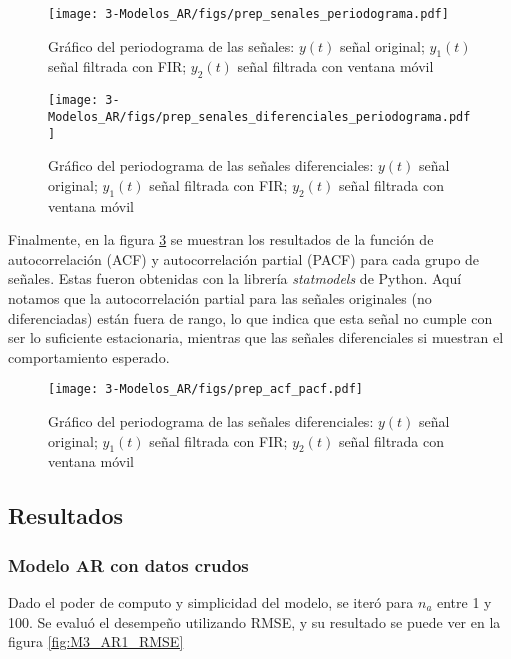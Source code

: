 \begin{figure}[H]
	\centering
	\texttt{[image: 3-Modelos\_AR/figs/prep\_senales\_periodograma.pdf]}
	\caption{Gráfico del periodograma de las señales: $y(t)$ señal original; $y_1(t)$ señal filtrada con FIR; $y_2(t)$ señal filtrada con ventana móvil}
	\label{fig:M3_pre_tiempo_periodograma}
\end{figure}


\begin{figure}[H]
	\centering
	\texttt{[image: 3-Modelos\_AR/figs/prep\_senales\_diferenciales\_periodograma.pdf]}
	\caption{Gráfico del periodograma de las señales diferenciales: $y(t)$ señal original; $y_1(t)$ señal filtrada con FIR; $y_2(t)$ señal filtrada con ventana móvil}
	\label{fig:M3_pre_tiempo_periodograma_diff}
\end{figure}


Finalmente, en la figura \ref{fig:M3_ACF y PACF} se muestran los resultados de la función de autocorrelación (ACF) y autocorrelación partial (PACF) para cada grupo de señales. Estas fueron obtenidas con la librería \emph{statmodels} de Python. Aquí notamos que la autocorrelación partial para las señales originales (no diferenciadas) están fuera de rango, lo que indica que esta señal no cumple con ser lo suficiente estacionaria, mientras que las señales diferenciales si muestran el comportamiento esperado. 



\begin{figure}[H]
	\centering
	\texttt{[image: 3-Modelos\_AR/figs/prep\_acf\_pacf.pdf]}
	\caption{Gráfico del periodograma de las señales diferenciales: $y(t)$ señal original; $y_1(t)$ señal filtrada con FIR; $y_2(t)$ señal filtrada con ventana móvil}
	\label{fig:M3_ACF y PACF}
\end{figure}


\subsection{Resultados}



\subsubsection{Modelo AR con datos crudos}

Dado el poder de computo y simplicidad del modelo, se iteró para $n_a$ entre 1 y 100. Se evaluó el desempeño utilizando RMSE, y su resultado se puede ver en la figura \ref{fig:M3_AR1_RMSE}


